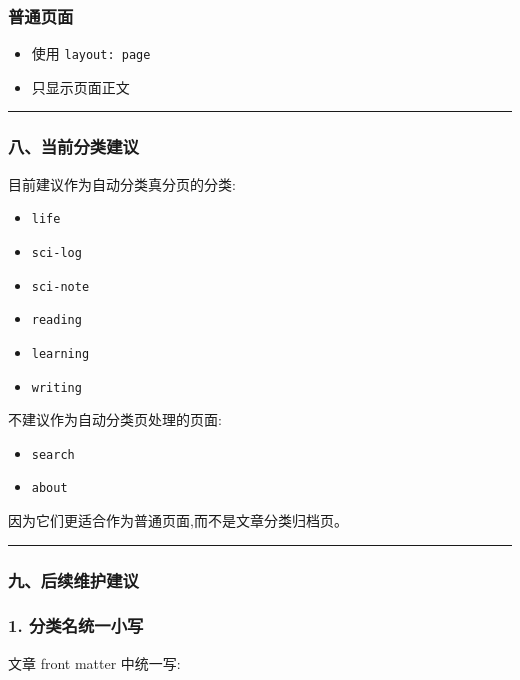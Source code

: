 \documentclass[lang=cn,scheme=chinese,color=blue,device=normal,toc=onecol,math=cm]{elegantbook}
\begin{document}
\subsubsection{普通页面}


\begin{itemize}
\item 使用 \texttt{layout: page}
\item 只显示页面正文
\end{itemize}


\medskip\hrule\medskip


\subsubsection{八、当前分类建议}


目前建议作为自动分类真分页的分类:\par


\begin{itemize}
\item \texttt{life}
\item \texttt{sci-log}
\item \texttt{sci-note}
\item \texttt{reading}
\item \texttt{learning}
\item \texttt{writing}
\end{itemize}


不建议作为自动分类页处理的页面:\par


\begin{itemize}
\item \texttt{search}
\item \texttt{about}
\end{itemize}


因为它们更适合作为普通页面,而不是文章分类归档页。\par


\medskip\hrule\medskip


\subsubsection{九、后续维护建议}


\subsubsection{1. 分类名统一小写}


文章 front matter 中统一写:\par
\end{document}
